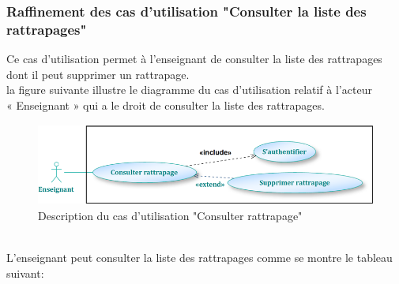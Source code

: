 \documentclass[12 pt ]{report}
\begin{document}
\subsubsection{Raffinement des cas d’utilisation "Consulter la liste des rattrapages"}
Ce cas d'utilisation permet à l'enseignant de consulter la liste des rattrapages dont il peut 
 supprimer un rattrapage.\\
la figure suivante illustre le diagramme du cas d’utilisation  relatif à l’acteur \\« Enseignant » qui a le droit de consulter la liste des rattrapages.
\begin{figure}[h]
\begin{center}
\includegraphics[width= 12cm , height =2.7cm]{enseignant2.png}
\caption{Description du cas d'utilisation "Consulter rattrapage"}
\end{center}
\end{figure}
\\
L'enseignant peut consulter la liste des rattrapages comme se montre le tableau suivant:
\end{document}
